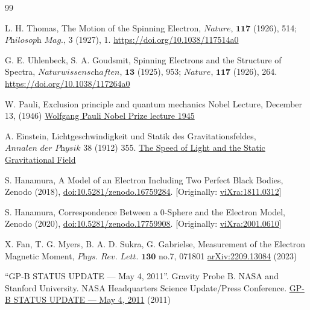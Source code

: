 \documentclass[10.5pt]{article}
\numberwithin{equation}{section}
\begin{document}
\begin{thebibliography}{99}

     L. H. Thomas, The Motion of the Spinning Electron, $\textit{Nature}$, $\textbf{117}$ (1926), 514; $\textit{Philosoph Mag.,}$ 3 (1927), 1. \href{https://www.nature.com/articles/117514a0}{https://doi.org/10.1038/117514a0}
    
     G. E. Uhlenbeck, S. A. Goudsmit, Spinning Electrons and the Structure of Spectra, $\textit{Naturwissenschaften}$, $\textbf{13}$ (1925), 953; $\textit{Nature}$, $\textbf{117}$ (1926), 264. \href{http://www.ffn.ub.es/luisnavarro/nuevo_maletin/Uhlenbeck_Goudsmit_1927.pdf}{https://doi.org/10.1038/117264a0}

     W. Pauli, Exclusion principle and quantum mechanics Nobel Lecture, December 13, (1946) \href{https://www.nobelprize.org/uploads/2018/06/pauli-lecture.pdf}{Wolfgang Pauli Nobel Prize lecture 1945}

     A. Einstein, Lichtgeschwindigkeit und Statik des Gravitationsfeldes, $\textit{Annalen der Physik}$ 38 (1912) 355. \href{http://myweb.rz.uni-augsburg.de/~eckern/adp/history/einstein-papers/1912_38_355-369.pdf}{The Speed of Light and the Static Gravitational Field}

     S. Hanamura, A Model of an Electron Including Two Perfect Black Bodies, Zenodo (2018), \href{https://doi.org/10.5281/zenodo.16759284}{doi:10.5281/zenodo.16759284}. [Originally: \href{http://vixra.org/abs/1811.0312}{viXra:1811.0312}]

     S. Hanamura, Correspondence Between a 0-Sphere and the Electron Model, Zenodo (2020), \href{https://doi.org/10.5281/zenodo.17759908}{doi:10.5281/zenodo.17759908}. [Originally: \href{https://vixra.org/abs/2001.0610}{viXra:2001.0610}]

     X. Fan, T. G. Myers, B. A. D. Sukra, G. Gabrielse, Measurement of the Electron Magnetic Moment, $\textit{Phys. Rev. Lett.}$ $\textbf{130}$ no.7, 071801 \href{https://arxiv.org/abs/2209.13084}{arXiv:2209.13084} (2023)


     ``GP-B STATUS UPDATE — May 4, 2011''. Gravity Probe B. NASA and Stanford University. NASA Headquarters Science Update/Press Conference. \href{http://einstein.stanford.edu/highlights/status1.html}{GP-B STATUS UPDATE — May 4, 2011} (2011)


\end{thebibliography}
\end{document}
